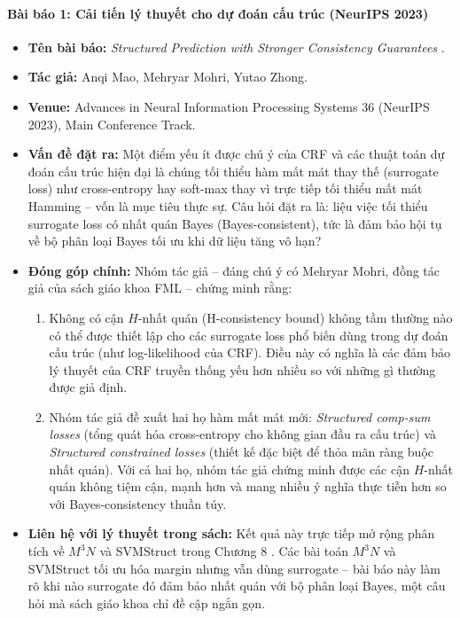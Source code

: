 \begin{expandbox}
\paragraph{Bài báo 1: Cải tiến lý thuyết cho dự đoán cấu trúc (NeurIPS 2023)}
\begin{itemize}[leftmargin=2em]
    \item \textbf{Tên bài báo:} \textit{Structured Prediction with Stronger Consistency Guarantees} \cite{mao2023structured}.
    \item \textbf{Tác giả:} Anqi Mao, Mehryar Mohri, Yutao Zhong.
    \item \textbf{Venue:} Advances in Neural Information Processing Systems 36 (NeurIPS 2023), Main Conference Track.
    \item \textbf{Vấn đề đặt ra:} Một điểm yếu ít được chú ý của CRF và các thuật toán dự đoán cấu trúc hiện đại là chúng tối thiểu hàm mất mát thay thế (surrogate loss) như cross-entropy hay soft-max thay vì trực tiếp tối thiểu mất mát Hamming -- vốn là mục tiêu thực sự. Câu hỏi đặt ra là: liệu việc tối thiểu surrogate loss có nhất quán Bayes (Bayes-consistent), tức là đảm bảo hội tụ về bộ phân loại Bayes tối ưu khi dữ liệu tăng vô hạn?
    \item \textbf{Đóng góp chính:} Nhóm tác giả -- đáng chú ý có Mehryar Mohri, đồng tác giả của sách giáo khoa FML \cite{mohri2018foundations} -- chứng minh rằng:
    \begin{enumerate}
        \item Không có cận $H$-nhất quán (H-consistency bound) không tầm thường nào có thể được thiết lập cho các surrogate loss phổ biến dùng trong dự đoán cấu trúc (như log-likelihood của CRF). Điều này có nghĩa là các đảm bảo lý thuyết của CRF truyền thống yếu hơn nhiều so với những gì thường được giả định.
        \item Nhóm tác giả đề xuất hai họ hàm mất mát mới: \textit{Structured comp-sum losses} (tổng quát hóa cross-entropy cho không gian đầu ra cấu trúc) và \textit{Structured constrained losses} (thiết kế đặc biệt để thỏa mãn ràng buộc nhất quán). Với cả hai họ, nhóm tác giả chứng minh được các cận $H$-nhất quán không tiệm cận, mạnh hơn và mang nhiều ý nghĩa thực tiễn hơn so với Bayes-consistency thuần túy.
    \end{enumerate}
    \item \textbf{Liên hệ với lý thuyết trong sách:} Kết quả này trực tiếp mở rộng phân tích về $M^3N$ và SVMStruct trong Chương 8 \cite{mohri2018foundations}. Các bài toán $M^3N$ và SVMStruct tối ưu hóa margin nhưng vẫn dùng surrogate -- bài báo này làm rõ khi nào surrogate đó đảm bảo nhất quán với bộ phân loại Bayes, một câu hỏi mà sách giáo khoa chỉ đề cập ngắn gọn.
\end{itemize}


\end{expandbox}
